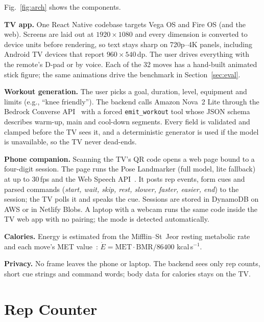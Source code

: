 \documentclass[conference]{IEEEtran}
\begin{document}
Fig.~\ref{fig:arch} shows the components.

\textbf{TV app.} One React Native codebase targets Vega OS and Fire OS (and the web).
Screens are laid out at $1920\times1080$ and every dimension is converted to device
units before rendering, so text stays sharp on 720p--4K panels, including Android TV
devices that report $960\times540$\,dp. The user drives everything with the remote's
D-pad or by voice. Each of the 32 moves has a hand-built animated stick figure; the same
animations drive the benchmark in Section~\ref{sec:eval}.

\textbf{Workout generation.} The user picks a goal, duration, level, equipment and
limits (e.g., ``knee friendly''). The backend calls Amazon Nova~2 Lite through the
Bedrock Converse API~\cite{awsconverse} with a forced \texttt{emit\_workout} tool whose
JSON schema describes warm-up, main and cool-down segments. Every field is validated
and clamped before the TV sees it, and a deterministic generator is used if the model
is unavailable, so the TV never dead-ends.

\textbf{Phone companion.} Scanning the TV's QR code opens a web page bound to a
four-digit session. The page runs the Pose Landmarker (full model, lite fallback) at
up to 30\,fps and the Web Speech API~\cite{webspeech}. It posts rep events, form cues and
parsed commands (\emph{start, wait, skip, rest, slower, faster, easier, end}) to the
session; the TV polls it and speaks the cue. Sessions are stored in DynamoDB on AWS or
in Netlify Blobs. A laptop with a webcam runs the same code inside the TV web app with
no pairing; the mode is detected automatically.

\textbf{Calories.} Energy is estimated from the Mifflin--St~Jeor resting metabolic
rate~\cite{mifflin1990} and each move's MET value~\cite{ainsworth2011compendium}:
$\dot{E} = \mathrm{MET}\cdot\mathrm{BMR}/86400$ kcal\,s$^{-1}$.

\textbf{Privacy.} No frame leaves the phone or laptop. The backend sees only rep
counts, short cue strings and command words; body data for calories stays on the TV.

\begin{table}[t]
\caption{MAE / OBOA by camera condition}
\label{tab:conditions}
\centering
\small

\end{table}

\section{Rep Counter}\label{sec:counter}
\end{document}
